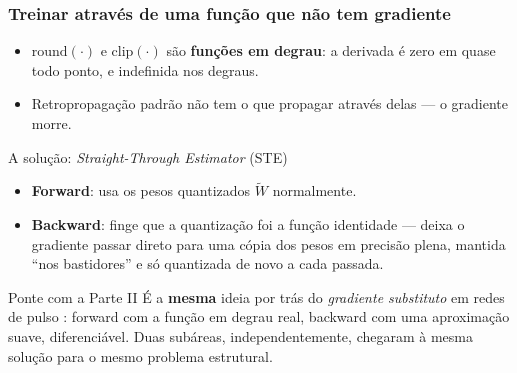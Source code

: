 \begin{frame}[shrink]
	\frametitle{Treinar através de uma função que não tem gradiente}
	\begin{itemize}
		\item $\text{round}(\cdot)$ e $\text{clip}(\cdot)$ são \textbf{funções em degrau}: a derivada é zero em quase todo ponto, e indefinida nos degraus.
		\item Retropropagação padrão não tem o que propagar através delas --- o gradiente morre.
	\end{itemize}
	\vspace{1pt}
	\begin{block}{A solução: \textit{Straight-Through Estimator} (STE)}
		\begin{itemize}
			\item \textbf{Forward}: usa os pesos quantizados $\widetilde{W}$ normalmente.
			\item \textbf{Backward}: finge que a quantização foi a função identidade --- deixa o gradiente passar direto para uma cópia dos pesos em precisão plena, mantida ``nos bastidores'' e só quantizada de novo a cada passada.
		\end{itemize}
	\end{block}
	\vspace{0pt}
	\begin{alertblock}{Ponte com a Parte II}
		É a \textbf{mesma} ideia por trás do \textit{gradiente substituto} em redes de pulso \cite{eshraghian2023training}: forward com a função em degrau real, backward com uma aproximação suave, diferenciável. Duas subáreas, independentemente, chegaram à mesma solução para o mesmo problema estrutural.
	\end{alertblock}
\end{frame}
